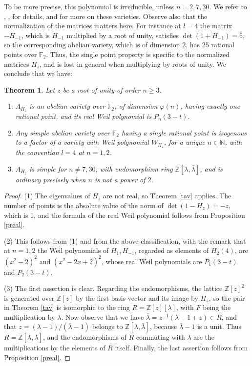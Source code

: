 \documentclass[11pt]{amsart}
\newtheorem{theorem}{Theorem}[section]
\theoremstyle{definition}
\begin{document}
To be more precise, this polynomial is irreducible, unless $n=2,7,30$. We refer to \cite{dke}, \cite{mpa}, \cite{rob} for details, and for more on these varieties. Observe also that the normalization of the matrices matters here. For instance at $l=4$ the matrix $-H_{-1}$, which is $H_{-1}$ multiplied by a root of unity, satisfies $\det(1+H_{-1})=5$, so the corresponding abelian variety, which is of dimension 2, has 25 rational points over $\mathbb F_2$. Thus, the single point property is specific to the normalized matrices $H_z$, and is lost in general when multiplying by roots of unity. We conclude that we have:

\begin{theorem}
Let $z$ be a root of unity of order $n\geq3$.
\begin{enumerate}
\item $A_{H_z}$ is an abelian variety over $\mathbb F_2$, of dimension $\varphi(n)$, having exactly one rational point, and its real Weil polynomial is $P_n(3-t)$.

\item Any simple abelian variety over $\mathbb F_2$ having a single rational point is isogenous to a factor of a variety with Weil polynomial $W_{H_z}$, for a unique $n\in\mathbb N$, with the convention $l=4$ at $n=1,2$.

\item $A_{H_z}$ is simple for $n\neq7,30$, with endomorphism ring $\mathbb Z[\lambda,\bar{\lambda}]$, and is ordinary precisely when $n$ is not a power of $2$.
\end{enumerate}
\end{theorem}

\begin{proof}
(1) The eigenvalues of $H_z$ are not real, so Theorem \ref{tav} applies. The number of points is the absolute value of the norm of $\det(1-H_z)=-z$, which is 1, and the formula of the real Weil polynomial follows from Proposition \ref{preal}.

\medskip

(2) This follows from (1) and from the above classification, with the remark that at $n=1,2$ the Weil polynomials of $H_1,H_{-1}$, regarded as elements of $H_2(4)$, are $(x^2-2)^2$ and $(x^2-2x+2)^2$, whose real Weil polynomials are $P_1(3-t)$ and $P_2(3-t)$.

\medskip

(3) The first assertion is clear. Regarding the endomorphisms, the lattice $\mathbb Z[z]^2$ is generated over $\mathbb Z[z]$ by the first basis vector and its image by $H_z$, so the pair in Theorem \ref{tav} is isomorphic to the ring $R=\mathbb Z[z][\lambda]$, with $F$ being the multiplication by $\lambda$. Now observe that we have $\bar{\lambda}=z^{-1}(\lambda-1+z)\in R$, and that $z=(\lambda-1)/(\bar{\lambda}-1)$ belongs to $\mathbb Z[\lambda,\bar{\lambda}]$, because $\bar{\lambda}-1$ is a unit. Thus $R=\mathbb Z[\lambda,\bar{\lambda}]$, and the endomorphisms of $R$ commuting with $\lambda$ are the multiplications by the elements of $R$ itself. Finally, the last assertion follows from Proposition \ref{preal}.
\end{proof}
\end{document}
